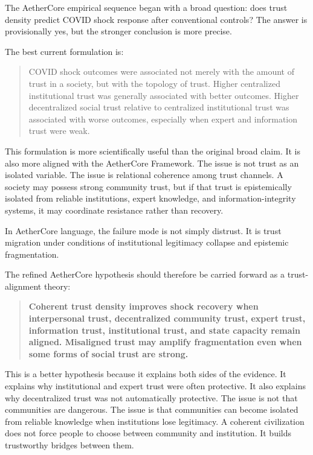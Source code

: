 \documentclass[12pt]{article}
\begin{document}
The AetherCore empirical sequence began with a broad question: does trust density predict COVID shock response after conventional controls? The answer is provisionally yes, but the stronger conclusion is more precise.

The best current formulation is:

\begin{quote}
COVID shock outcomes were associated not merely with the amount of trust in a society, but with the topology of trust. Higher centralized institutional trust was generally associated with better outcomes. Higher decentralized social trust relative to centralized institutional trust was associated with worse outcomes, especially when expert and information trust were weak.
\end{quote}

This formulation is more scientifically useful than the original broad claim. It is also more aligned with the AetherCore Framework. The issue is not trust as an isolated variable. The issue is relational coherence among trust channels. A society may possess strong community trust, but if that trust is epistemically isolated from reliable institutions, expert knowledge, and information-integrity systems, it may coordinate resistance rather than recovery.

In AetherCore language, the failure mode is not simply distrust. It is trust migration under conditions of institutional legitimacy collapse and epistemic fragmentation.

The refined AetherCore hypothesis should therefore be carried forward as a trust-alignment theory:

\begin{quote}
\textbf{Coherent trust density improves shock recovery when interpersonal trust, decentralized community trust, expert trust, information trust, institutional trust, and state capacity remain aligned. Misaligned trust may amplify fragmentation even when some forms of social trust are strong.}
\end{quote}

This is a better hypothesis because it explains both sides of the evidence. It explains why institutional and expert trust were often protective. It also explains why decentralized trust was not automatically protective. The issue is not that communities are dangerous. The issue is that communities can become isolated from reliable knowledge when institutions lose legitimacy. A coherent civilization does not force people to choose between community and institution. It builds trustworthy bridges between them.
\end{document}
